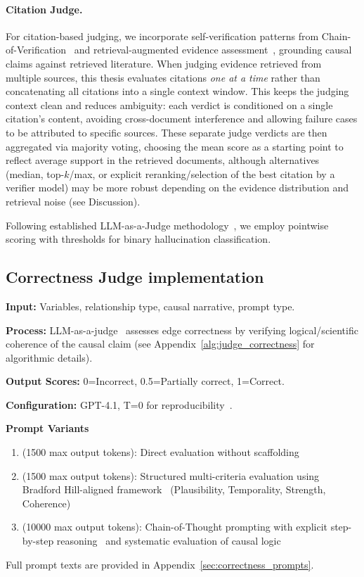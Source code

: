 \paragraph{Citation Judge.}
For citation-based judging, we incorporate self-verification patterns from Chain-of-Verification~\citep{dhuliawala2024chain} and retrieval-augmented evidence assessment~\citep{gao2024retrievalaugmentedgenerationlargelanguage}, grounding causal claims against retrieved literature. When judging evidence retrieved from multiple sources, this thesis evaluates citations \emph{one at a time} rather than concatenating all citations into a single context window. This keeps the judging context clean and reduces ambiguity: each verdict is conditioned on a single citation's content, avoiding cross-document interference and allowing failure cases to be attributed to specific sources. These separate judge verdicts are then aggregated via majority voting, choosing the mean score as a starting point to reflect average support in the retrieved documents, although alternatives (median, top-$k$/max, or explicit reranking/selection of the best citation by a verifier model) may be more robust depending on the evidence distribution and retrieval noise (see Discussion).

Following established LLM-as-a-Judge methodology~\citep{zheng2024judging}, we employ pointwise scoring with thresholds for binary hallucination classification.

\subsection{Correctness Judge implementation}
\label{sec:correctness_judge}
\textbf{Input:} Variables, relationship type, causal narrative, prompt type.

\textbf{Process:} LLM-as-a-judge~\cite{zheng2024llmasajudge} assesses edge correctness by verifying logical/scientific coherence of the causal claim (see Appendix~\ref{alg:judge_correctness} for algorithmic details).

\textbf{Output Scores:} 0=Incorrect, 0.5=Partially correct, 1=Correct.

\textbf{Configuration:} GPT-4.1, T=0 for reproducibility~\citep{liu2023gevalnlgevaluationusing, zheng2024judging}.

\noindent\textbf{Prompt Variants}
\begin{enumerate}[noitemsep]
    \item \textbf{\PromptBaseline} (1500 max output tokens): Direct evaluation without scaffolding
    \item \textbf{\PromptMechanistic} (1500 max output tokens): Structured multi-criteria evaluation using Bradford Hill-aligned framework~\cite{shimonovich2020bradford} (Plausibility, Temporality, Strength, Coherence)
    \item \textbf{\PromptCoT} (10000 max output tokens): Chain-of-Thought prompting with explicit step-by-step reasoning~\cite{kojima2022large} and systematic evaluation of causal logic
\end{enumerate}
Full prompt texts are provided in Appendix~\ref{sec:correctness_prompts}.

